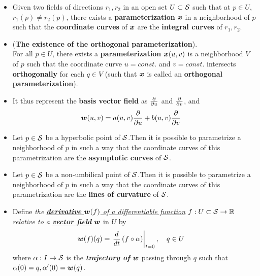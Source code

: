 \documentclass[11pt]{article}
\begin{document}
\begin{itemize}
 \item \begin{corollary}\label{cor: local_parm_field_dir}
 Given two fields of directions $r_{1}, r_{2}$ in an open set $U\subset {\mathcal S}$ such that at $p\in U$, $r_{1}(p)\neq r_{2}(p)$, there exists a \textbf{parameterization} $\boldsymbol{x}$ in a neighborhood of $p$ such that the \textbf{coordinate curves} of $\boldsymbol{x}$ are the \textbf{integral curves} of $r_{1}, r_{2}$.
 \end{corollary}
 
 \item \begin{corollary}\label{cor: local_parm_field_dir}
 (\textbf{The existence of the orthogonal parameterization}). \\
For all $p\in U$, there exists a \textbf{parameterization} $\boldsymbol{x}(u,v)$ is a neighborhood $V$ of $p$ such that the coordinate curve $u=const.$ and $v=const.$ intersects \textbf{orthogonally} for each $q\in V$ (such that $\boldsymbol{x}$ is called an \textbf{orthogonal parameterization}).
 \end{corollary}
 
 \item It thus represent the \textbf{basis vector field} as $\frac{\partial }{ \partial u}$ and $\frac{\partial }{ \partial v}$, and
 \begin{align*}
 \boldsymbol{w}(u,v) & = a(u,v)\frac{\partial }{ \partial u} + b(u,v)\frac{\partial }{ \partial v}
 \end{align*}

\item \begin{corollary}
Let $p\in {\mathcal S}$ be a hyperbolic point of ${\mathcal S}$.Then it is possible to parametrize a neighborhood of $p$ in such a way that the coordinate curves of this parametrization are the \textbf{asymptotic curves} of ${\mathcal S}$.
\end{corollary} 

\item \begin{corollary}
Let $p\in {\mathcal S}$ be a non-umbilical point of ${\mathcal S}$.Then it is possible to parametrize a neighborhood of $p$ in such a way that the coordinate curves of this parametrization are the \textbf{lines of curvature} of ${\mathcal S}$.
\end{corollary} 

 

\item  \begin{definition}
Define \emph{the \underline{\textbf{derivative} $\boldsymbol{w}(f)$ of a differentiable function} $f: U\subset {\mathcal S} \rightarrow {\mathbb R}$ relative to a \underline{\textbf{vector field}}} $\boldsymbol{w}$ in $U$ by 
\begin{align*}
\boldsymbol{w}(f)(q) &= \left.{\frac{d}{dt}\left(f\circ \alpha\right)}\right\vert_{t=0},\quad q\in U
\end{align*}
where $\alpha: I\rightarrow {\mathcal S}$ is the \emph{\textbf{trajectory of}} $\boldsymbol{w}$ passing through $q$ such that $\alpha(0) = q, \alpha'(0)=\boldsymbol{w}(q)$.
\end{definition}


\end{itemize}
\end{document}
